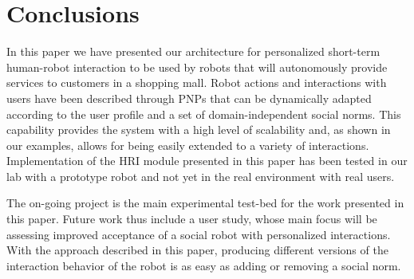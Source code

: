 \vspace{-0.2cm}
\section{Conclusions}
\vspace{-0.1cm}

In this paper we have presented our architecture for personalized short-term human-robot interaction to be used by {\coaches} robots that will autonomously provide services to customers in a shopping mall.
Robot actions and interactions with users have been described through PNPs that can be dynamically adapted according to the user profile and a set of domain-independent social norms. This capability provides the system with a high level of scalability and, as shown in our examples, allows for being easily extended to a variety of interactions.
Implementation of the HRI module presented in this paper has been tested in our lab with a prototype robot and not yet in the real environment with real users.

The on-going {\coaches} project is the main experimental test-bed for the work presented in this paper. Future work thus include a user study, whose main focus will be assessing improved acceptance of a social robot with personalized interactions. With the approach described in this paper, producing different versions of the interaction behavior of the robot is as easy as adding or removing a social norm.
